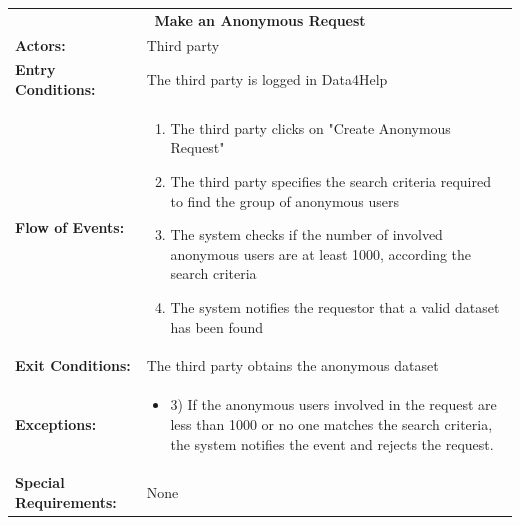 \begin{table}[H]
	\centering
	{\renewcommand{\arraystretch}{1.5}%
		\begin{tabular}{|@{\hspace{2em}} p{4cm} @{}| p{11cm} @{\qquad}|}
			\cline{1-2}
			\multicolumn{2}{|c|}{\textbf{Make an Anonymous Request}} \\ \cline{1-2}
			\textbf{Actors:} & Third party \\ \cline{1-2}
			\textbf{Entry Conditions:} & The third party is logged in Data4Help \\ \cline{1-2}
			\textbf{Flow of Events:} & 
			\begin{enumerate}[itemsep=-0.2em, topsep=0em]
				\item The third party clicks on "Create Anonymous Request"
				\item The third party specifies the search criteria required to find the group of anonymous users
				\item The system checks if the number of involved anonymous users are at least 1000, according the search criteria
				\item The system notifies the requestor that a valid dataset has been found
			\end{enumerate}\\ \cline{1-2}
			\textbf{Exit Conditions:} & The third party obtains the anonymous dataset \\ \cline{1-2}
			\textbf{Exceptions:} & 
			\begin{itemize} [itemsep=-0.2em, topsep=0em]
				\item 3) If the anonymous users involved in the request are less than 1000 or no one matches the search criteria, the system notifies the event and rejects the request.
			\end{itemize} \\ \cline{1-2}
			\textbf{Special Requirements:} & None \\ \hline
	\end{tabular}} \quad
\end{table}


